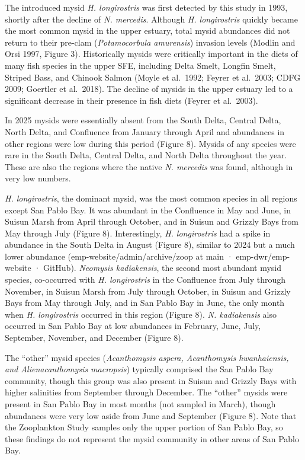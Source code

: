 \documentclass[
  letterpaper,
]{article}
\begin{document}
The introduced mysid \emph{H. longirostris} was first detected by this
study in 1993, shortly after the decline of \emph{N. mercedis}. Although
\emph{H. longirostris} quickly became the most common mysid in the upper
estuary, total mysid abundances did not return to their pre-clam
(\emph{Potamocorbula amurensis}) invasion levels (Modlin and Orsi 1997,
Figure 3). Historically mysids were critically important in the diets of
many fish species in the upper SFE, including Delta Smelt, Longfin
Smelt, Striped Bass, and Chinook Salmon (Moyle et al.~1992; Feyrer et
al.~2003; CDFG 2009; Goertler et al.~2018). The decline of mysids in the
upper estuary led to a significant decrease in their presence in fish
diets (Feyrer et al.~2003).

In 2025 mysids were essentially absent from the South Delta, Central
Delta, North Delta, and Confluence from January through April and
abundances in other regions were low during this period (Figure 8).
Mysids of any species were rare in the South Delta, Central Delta, and
North Delta throughout the year. These are also the regions where the
native \emph{N. mercedis} was found, although in very low numbers.

\emph{H. longirostris}, the dominant mysid, was the most common species
in all regions except San Pablo Bay. It was abundant in the Confluence
in May and June, in Suisun Marsh from April through October, and in
Suisun and Grizzly Bays from May through July (Figure 8). Interestingly,
\emph{H. longirostris} had a spike in abundance in the South Delta in
August (Figure 8), similar to 2024 but a much lower abundance
(emp-website/admin/archive/zoop at main · emp-dwr/emp-website · GitHub).
\emph{Neomysis kadiakensis}, the second most abundant mysid species,
co-occurred with \emph{H. longirostris} in the Confluence from July
through November, in Suisun Marsh from July through October, in Suisun
and Grizzly Bays from May through July, and in San Pablo Bay in June,
the only month when \emph{H. longirostris} occurred in this region
(Figure 8). \emph{N. kadiakensis} also occurred in San Pablo Bay at low
abundances in February, June, July, September, November, and December
(Figure 8).

The ``other'' mysid species (\emph{Acanthomysis aspera, Acanthomysis
hwanhaiensis, and Alienacanthomysis macropsis}) typically comprised the
San Pablo Bay community, though this group was also present in Suisun
and Grizzly Bays with higher salinities from September through December.
The ``other'' mysids were present in San Pablo Bay in most months (not
sampled in March), though abundances were very low aside from June and
September (Figure 8). Note that the Zooplankton Study samples only the
upper portion of San Pablo Bay, so these findings do not represent the
mysid community in other areas of San Pablo Bay.
\end{document}
